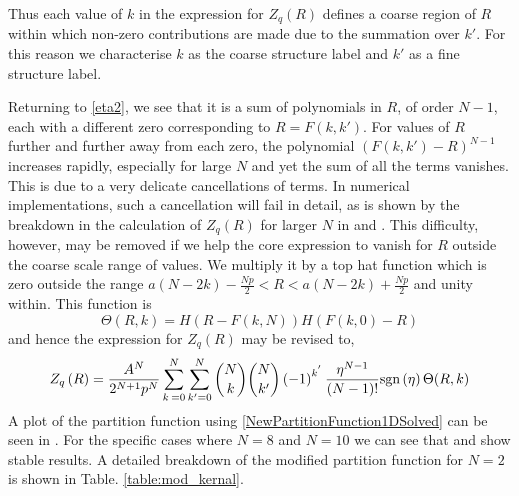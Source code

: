 Thus each value of $k$ in the expression for $Z_{q}\left(R\right)$ defines a coarse region of $R$ within which non-zero contributions are made due to the summation over $k'$. For this reason we characterise $k$ as the coarse structure label and $k'$ as a fine structure label.

Returning to \eqref{eta2}, we see that it is a sum of polynomials in $R$, of order $N-1$, each with a different zero corresponding to $R=F(k,k')$. For values of $R$  further and further away from each zero, the polynomial $(F(k,k')-R)^{N-1}$ increases rapidly, especially for large $N$ and yet the sum of all the terms vanishes. This is due to a very delicate cancellations of terms. In numerical implementations, such a cancellation will fail in detail, as is shown by the breakdown in the calculation of $Z_{q}\left(R\right)$ for larger $N$ in  and . This difficulty, however, may be removed if we help the core expression to vanish for $R$ outside the coarse scale range of values. We multiply it by a top hat function which is zero outside the range $a(N-2k) -\frac{Np}{2} < R < a(N-2k)+\frac{Np}{2}$ and unity within. This function is 
%
\begin{equation}
\Theta(R,k)=H(R-F(k,N))H(F(k,0)-R)\label{AdjustmentTopHat}
\end{equation}
%
and hence the expression for $Z_{q}(R)$ may be revised to,
%
\begin{equation}
Z_{q}\left(R\right)=\frac{A^{N}}{2^{N+1} p^{N}}\sum_{k^{\,}=0}^{N}\sum_{{k}'=0}^{N}\binom{N}{k}\binom{N}{k'}\left(-1\right)^{k^{'}}\frac{\eta^{N-1}}{\left(N-1\right)!}\text{sgn}\left(\eta\right)\Theta(R,k)\label{NewPartitionFunction1DSolved}
\end{equation}
%
A plot of the partition function using \eqref{NewPartitionFunction1DSolved} can be seen in . For the specific cases where $N=8$ and $N=10$ we can see that  and  show stable results. A detailed breakdown of the modified partition function for $N=2$ is shown in Table. \ref{table:mod_kernal}.

